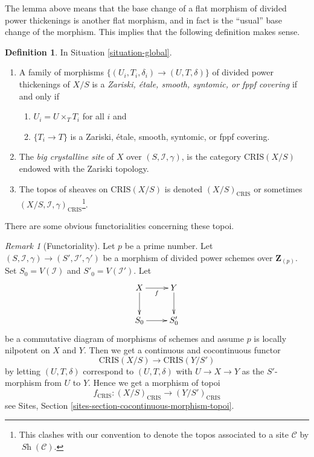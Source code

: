 \documentclass{stacks-project}
\theoremstyle{plain}
\theoremstyle{definition}
\newtheorem{definition}[subsection]{Definition}
\theoremstyle{remark}
\newtheorem{remark}[subsection]{Remark}
\numberwithin{equation}{subsection}
\def\Sh{\mathop{\mathit{Sh}}\nolimits}
\begin{document}
\noindent
The lemma above means that the base change of a flat morphism
of divided power thickenings is another flat morphism, and in
fact is the ``usual'' base change of the morphism. This implies
that the following definition makes sense.

\begin{definition}
\label{definition-big-crystalline-site}
In Situation \ref{situation-global}.
\begin{enumerate}
\item A family of morphisms $\{(U_i, T_i, \delta_i) \to (U, T, \delta)\}$
of divided power thickenings of $X/S$ is a
{\it Zariski, \'etale, smooth, syntomic, or fppf covering}
if and only if
\begin{enumerate}
\item $U_i = U \times_T T_i$ for all $i$ and
\item $\{T_i \to T\}$ is a Zariski, \'etale, smooth, syntomic, or fppf covering.
\end{enumerate}
\item The {\it big crystalline site} of $X$ over $(S, \mathcal{I}, \gamma)$,
is the category $\text{CRIS}(X/S)$ endowed with the Zariski topology.
\item The topos of sheaves on $\text{CRIS}(X/S)$ is denoted
$(X/S)_{\text{CRIS}}$ or sometimes
$(X/S, \mathcal{I}, \gamma)_{\text{CRIS}}$\footnote{This clashes with
our convention to denote the topos associated to a site $\mathcal{C}$
by $\Sh(\mathcal{C})$.}.
\end{enumerate}
\end{definition}

\noindent
There are some obvious functorialities concerning these topoi.

\begin{remark}[Functoriality]
\label{remark-functoriality-big-cris}
Let $p$ be a prime number.
Let $(S, \mathcal{I}, \gamma) \to (S', \mathcal{I}', \gamma')$ be a
morphism of divided power schemes over $\mathbf{Z}_{(p)}$.
Set $S_0 = V(\mathcal{I})$ and $S'_0 = V(\mathcal{I}')$.
Let
$$
\xymatrix{
X \ar[r]_f \ar[d] & Y \ar[d] \\
S_0 \ar[r] & S'_0
}
$$
be a commutative diagram of morphisms of schemes and assume $p$ is
locally nilpotent on $X$ and $Y$. Then we get a continuous and
cocontinuous functor
$$
\text{CRIS}(X/S) \longrightarrow \text{CRIS}(Y/S')
$$
by letting $(U, T, \delta)$ correspond to $(U, T, \delta)$
with $U \to X \to Y$ as the $S'$-morphism from $U$ to $Y$.
Hence we get a morphism of topoi
$$
f_{\text{CRIS}} : (X/S)_{\text{CRIS}} \longrightarrow (Y/S')_{\text{CRIS}}
$$
see Sites, Section \ref{sites-section-cocontinuous-morphism-topoi}.
\end{remark}
\end{document}
